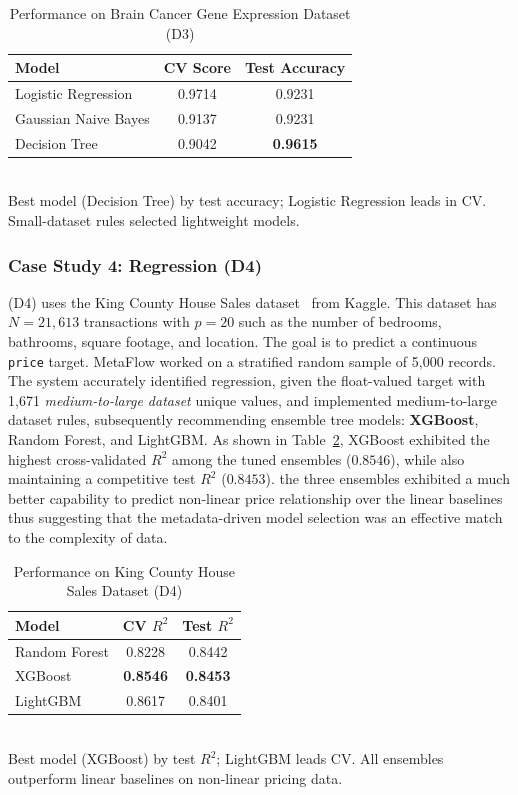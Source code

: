 \documentclass[conference]{llncs}
\begin{document}
   \begin{table}[htbp]
   \centering
   \caption{Performance on Brain Cancer Gene Expression Dataset (D3)}
   \label{tab:d3_results}
   \small
   \begin{tabular}{lcc}
   \hline
   \textbf{Model} & \textbf{CV Score} & \textbf{Test Accuracy} \\
   \hline
   Logistic Regression & 0.9714 & 0.9231 \\
   Gaussian Naive Bayes & 0.9137 & 0.9231 \\
   Decision Tree & 0.9042 & \textbf{0.9615} \\
   \hline
   \end{tabular}\\
   {\scriptsize Best model (Decision Tree) by test accuracy; Logistic Regression leads in CV. Small-dataset rules selected lightweight models.}
   \end{table}

   \subsubsection{Case Study 4: Regression (D4)} %
(D4) uses the King County House Sales dataset~\cite{harlfoxem2016kc} from Kaggle. This dataset has $N=21{,}613$ transactions with $p=20$ such as the number of bedrooms, bathrooms, square footage, and location. The goal is to predict a continuous \texttt{price} target. MetaFlow worked on a stratified random sample of 5{,}000
records. The system accurately identified regression, given the float-valued target with 1{,}671 \textit{medium-to-large dataset} unique values, and implemented medium-to-large dataset rules, subsequently recommending ensemble tree models: \textbf{XGBoost}, Random Forest, and LightGBM.
As shown in Table~\ref{tab:d4_results}, XGBoost exhibited the highest cross-validated $R^2$ among the tuned ensembles ($0.8546$), while also maintaining a competitive test $R^2$ ($0.8453$). the three ensembles exhibited a much better capability to predict non-linear price relationship over the linear baselines thus suggesting that the metadata-driven model selection was an effective match to the complexity of data.


   \begin{table}[htbp]
   \centering
   \caption{Performance on King County House Sales Dataset (D4)}
   \label{tab:d4_results}
   \small
   \begin{tabular}{lcc}
   \hline
   \textbf{Model} & \textbf{CV $R^2$} & \textbf{Test $R^2$} \\
   \hline
   Random Forest & 0.8228 & 0.8442 \\
   XGBoost & \textbf{0.8546} & \textbf{0.8453} \\
   LightGBM & 0.8617 & 0.8401 \\
   \hline
   \end{tabular}\\
   {\scriptsize Best model (XGBoost) by test $R^2$; LightGBM leads CV. All ensembles outperform linear baselines on non-linear pricing data.}
   \end{table}
\end{document}
